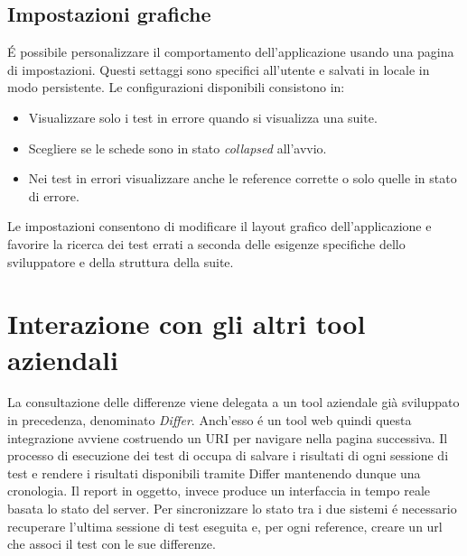        \subsection{Impostazioni grafiche}
            \'E possibile personalizzare il comportamento dell'applicazione usando una pagina di impostazioni.
            Questi settaggi sono specifici all'utente e salvati in locale in modo persistente.
            Le configurazioni disponibili consistono in:
            \begin{itemize}
                \item Visualizzare solo i test in errore quando si visualizza una suite.
                \item Scegliere se le schede sono in stato \textit{collapsed} all'avvio.
                \item Nei test in errori visualizzare anche le reference corrette o solo quelle in stato di errore.
            \end{itemize}
            Le impostazioni consentono di modificare il layout grafico dell'applicazione e favorire la ricerca dei test errati a seconda delle esigenze specifiche dello sviluppatore e della struttura della suite.
    \section{Interazione con gli altri tool aziendali}
        La consultazione delle differenze viene delegata a un tool aziendale già sviluppato in precedenza, denominato \textit{Differ}.
        Anch'esso \'e un tool web quindi questa integrazione avviene  costruendo un URI per navigare nella pagina successiva.
        Il processo di esecuzione dei test di occupa di salvare i risultati di ogni sessione di test e rendere i risultati disponibili tramite Differ mantenendo dunque una cronologia.
        Il report in oggetto, invece produce un interfaccia in tempo reale basata lo stato del server.
        Per sincronizzare lo stato tra i due sistemi \'e necessario recuperare l'ultima sessione di test eseguita e, per ogni reference, creare un url che associ il test con le sue differenze.